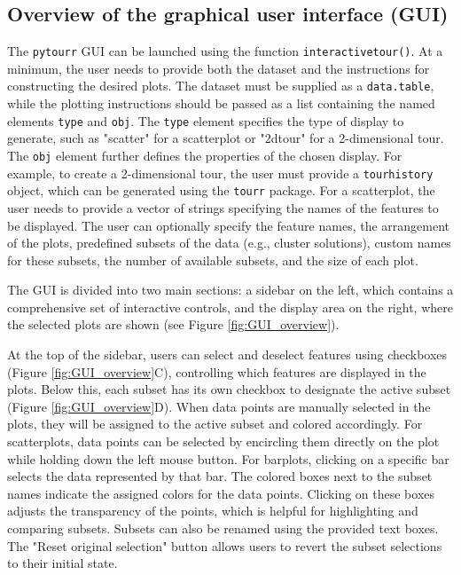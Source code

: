 \documentclass[article]{ajs}
\begin{document}
\subsection{Overview of the graphical user interface (GUI)}

The \texttt{pytourr} GUI can be launched using the function \texttt{interactive\textunderscore tour()}. At a minimum, the user needs to provide both the dataset and the instructions for constructing the desired plots. The dataset must be supplied as a \texttt{data.table}, while the plotting instructions should be passed as a list containing the named elements \texttt{type} and \texttt{obj}. The \texttt{type} element specifies the type of display to generate, such as "scatter" for a scatterplot or "2d\textunderscore tour" for a 2-dimensional tour. The \texttt{obj} element further defines the properties of the chosen display. For example, to create a 2-dimensional tour, the user must provide a \texttt{tour\textunderscore history} object, which can be generated using the \texttt{tourr} package. For a scatterplot, the user needs to provide a vector of strings specifying the names of the features to be displayed. The user can optionally specify the feature names, the arrangement of the plots, predefined subsets of the data (e.g., cluster solutions), custom names for these subsets, the number of available subsets, and the size of each plot.

The GUI is divided into two main sections: a sidebar on the left, which contains a comprehensive set of interactive controls, and the display area on the right, where the selected plots are shown (see Figure \ref{fig:GUI_overview}).

At the top of the sidebar, users can select and deselect features using checkboxes (Figure \ref{fig:GUI_overview}C), controlling which features are displayed in the plots. Below this, each subset has its own checkbox to designate the active subset (Figure \ref{fig:GUI_overview}D). When data points are manually selected in the plots, they will be assigned to the active subset and colored accordingly. For scatterplots, data points can be selected by encircling them directly on the plot while holding down the left mouse button. For barplots, clicking on a specific bar selects the data represented by that bar. The colored boxes next to the subset names indicate the assigned colors for the data points. Clicking on these boxes adjusts the transparency of the points, which is helpful for highlighting and comparing subsets. Subsets can also be renamed using the provided text boxes. The "Reset original selection" button allows users to revert the subset selections to their initial state.
\end{document}
